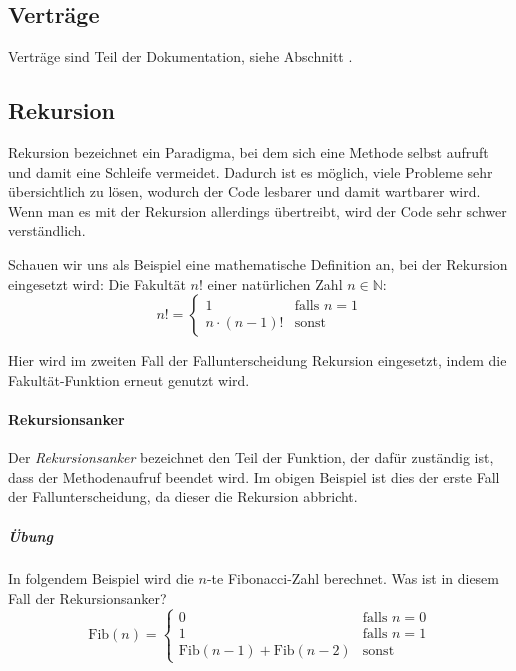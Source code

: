 \subsection{Verträge} \functionalMark \imperativeMark \oopMark
	Verträge sind Teil der Dokumentation, siehe Abschnitt .

\subsection{Rekursion} \functionalMark \imperativeMark \oopMark
	\label{sec:abstract_recursion}

	
	Rekursion bezeichnet ein Paradigma, bei dem sich eine Methode selbst aufruft und damit eine Schleife vermeidet. Dadurch ist es möglich, viele Probleme sehr übersichtlich zu lösen, wodurch der Code lesbarer und damit wartbarer wird. Wenn man es mit der Rekursion allerdings übertreibt, wird der Code sehr schwer verständlich.
	
	Schauen wir uns als Beispiel eine mathematische Definition an, bei der Rekursion eingesetzt wird: Die Fakultät \( n! \) einer natürlichen Zahl \( n \in \mathbb{N} \):
	\begin{equation*}
		n! =
			\begin{cases}
				1                & \text{falls } n = 1 \\
				n \cdot (n - 1)! & \text{sonst}
			\end{cases}
	\end{equation*}
	
	Hier wird im zweiten Fall der Fallunterscheidung Rekursion eingesetzt, indem die Fakultät-Funktion erneut genutzt wird.
	
	\paragraph{Rekursionsanker}
		Der \textit{Rekursionsanker} bezeichnet den Teil der Funktion, der dafür zuständig ist, dass der Methodenaufruf beendet wird. Im obigen Beispiel ist dies der erste Fall der Fallunterscheidung, da dieser die Rekursion abbricht.
		
		\subparagraph{Übung}
		In folgendem Beispiel wird die \(n\)-te Fibonacci-Zahl berechnet. Was ist in diesem Fall der Rekursionsanker?
		\begin{equation*}
			\text{Fib}(n) =
				\begin{cases}
					0                                     & \text{falls } n = 0 \\
					1                                     & \text{falls } n = 1 \\
					\text{Fib}(n - 1) + \text{Fib}(n - 2) & \text{sonst}
				\end{cases}
		\end{equation*}

